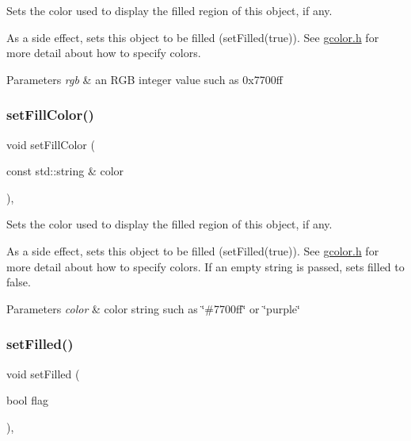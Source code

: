Sets the color used to display the filled region of this object, if any. 

As a side effect, sets this object to be filled (set\+Filled(true)). See \mbox{\hyperlink{gcolor_8h_source}{gcolor.\+h}} for more detail about how to specify colors.


\begin{DoxyParams}{Parameters}
{\em rgb} & an R\+GB integer value such as 0x7700ff \\
\hline
\end{DoxyParams}
\mbox{\label{classsgl_1_1GObject_adbc18b1a930aadd97d7437f9f7265b96}} 
\subsubsection{\texorpdfstring{set\+Fill\+Color()}{setFillColor()}\hspace{0.1cm}{\footnotesize\ttfamily [3/3]}}
{\footnotesize\ttfamily void set\+Fill\+Color (\begin{DoxyParamCaption}\item[{const std\+::string \&}]{color }\end{DoxyParamCaption})\hspace{0.3cm}{\ttfamily [virtual]}, {\ttfamily [inherited]}}



Sets the color used to display the filled region of this object, if any. 

As a side effect, sets this object to be filled (set\+Filled(true)). See \mbox{\hyperlink{gcolor_8h_source}{gcolor.\+h}} for more detail about how to specify colors. If an empty string is passed, sets filled to false.


\begin{DoxyParams}{Parameters}
{\em color} & color string such as \char`\"{}\#7700ff\char`\"{} or \char`\"{}purple\char`\"{} \\
\hline
\end{DoxyParams}
\mbox{\label{classsgl_1_1GObject_a9b82b53362282c6bb7d6947068d2e55b}} 
\subsubsection{\texorpdfstring{set\+Filled()}{setFilled()}}
{\footnotesize\ttfamily void set\+Filled (\begin{DoxyParamCaption}\item[{bool}]{flag }\end{DoxyParamCaption})\hspace{0.3cm}{\ttfamily [virtual]}, {\ttfamily [inherited]}}



